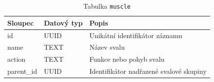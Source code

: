 \begin{table}[ht!]
    \centering
    \begin{tabularx}{\textwidth}{|l|l|L|}
        \hline
        \textbf{Sloupec} & \textbf{Datový typ} & \textbf{Popis}                          \\ \hline
        id               & UUID                & Unikátní identifikátor záznamu          \\ \hline
        name             & TEXT                & Název svalu                             \\ \hline
        action           & TEXT                & Funkce nebo pohyb svalu                 \\ \hline
        parent\_id       & UUID                & Identifikátor nadřazené svalové skupiny \\ \hline
    \end{tabularx}
    \caption{Tabulka \texttt{muscle}}
    \label{tab:muscle}
\end{table}
